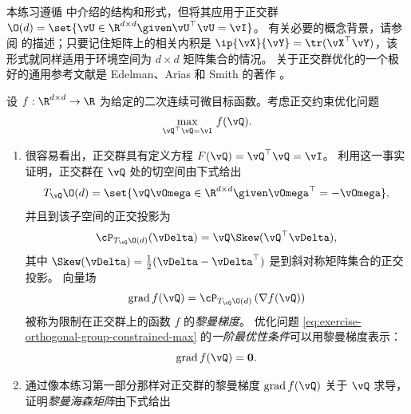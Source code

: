 \documentclass[../../book-main_zh.tex]{subfiles}
\begin{document}
\begin{exercise}\label{exercise:orthogonal-group-calculus}
    本练习遵循  中介绍的结构和形式，但将其应用于正交群 $\O(d)
    = \set{\vU \in \R^{d \times d} \given
    \vU^\top \vU = \vI}$。
    有关必要的概念背景，请参阅  的描述；只要记住矩阵上的相关内积是
    $\ip{\vX}{\vY} = \tr(\vX^\top \vY)$，该形式就同样适用于环境空间为 $d
    \times d$ 矩阵集合的情况。
    关于正交群优化的一个极好的通用参考文献是 Edelman、Arias 和 Smith 的著作 \cite{Edelman1998-lg}。

    设 $f : \R^{d\times d} \to \R$ 为给定的二次连续可微目标函数。考虑正交约束优化问题
    \begin{equation}\label{eq:exercise-orthogonal-group-constrained-max}
        \max_{\vQ^\top \vQ = \vI}\, f(\vQ).
    \end{equation}
    \begin{enumerate}
        \item  很容易看出，正交群具有定义方程 $F(\vQ) = \vQ^\top \vQ = \vI$。
            利用这一事实证明，正交群在 $\vQ$ 处的切空间由下式给出
            \begin{equation*}
                T_{\vQ} \O(d) = \set{\vQ \vOmega \in \R^{d\times d}
                \given \vOmega^\top = - \vOmega},
            \end{equation*}
            并且到该子空间的正交投影为
            \begin{equation*}
                \cP_{T_{\vQ}\O(d)}(\vDelta) =  \vQ \Skew(\vQ^\top \vDelta),
            \end{equation*}
            其中 $\Skew(\vDelta) = \tfrac{1}{2} ( \vDelta -
            \vDelta^\top)$ 是到斜对称矩阵集合的正交投影。
            向量场
            \begin{equation}\label{eq:exercise-riemann-grad-orthogonal-group}
                \mathrm{grad}\, f(\vQ) = \cP_{T_{\vQ} \O(d)} \left(
                \nabla f(\vQ) \right)
            \end{equation}
            被称为限制在正交群上的函数 $f$ 的\textit{黎曼梯度}。
            优化问题
            \eqref{eq:exercise-orthogonal-group-constrained-max}
            的\textit{一阶最优性条件}可以用黎曼梯度表示：
            \begin{equation*}
                \mathrm{grad}\, f(\vQ) = \mathbf{0}.
            \end{equation*}
        \item 通过像本练习第一部分那样对正交群的黎曼梯度
            $\mathrm{grad}\, f(\vQ)$ 关于 $\vQ$ 求导，证明\textit{黎曼海森矩阵}由下式给出

\end{enumerate}
\end{exercise}
\end{document}
